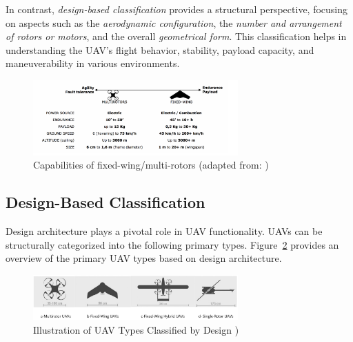 \vspace{0.5cm}

In contrast, \textit{design-based classification} provides a structural perspective, focusing on aspects such as the \textit{aerodynamic configuration}, the \textit{number and arrangement of rotors or motors}, and the overall \textit{geometrical form}. This classification helps in understanding the UAV's flight behavior, stability, payload capacity, and maneuverability in various environments.


\begin{figure}[H]  %
    \centering
    \includegraphics[width=0.7\textwidth]{Figures/Chapter1/Section1/1.png} %
    \caption{ Capabilities of fixed-wing/multi-rotors (adapted from: \cite{khan2024smarttraffic})}
    \label{fig:method3_architecture} %
\end{figure}




\subsection{Design-Based Classification}

Design architecture plays a pivotal role in UAV functionality. UAVs can be structurally categorized into the following primary types. Figure~\ref{fig:uav_design_types} provides an overview of the primary UAV types based on design architecture.

\begin{figure}[H]  %
    \centering
    \includegraphics[width=0.7\textwidth]{Figures/Chapter1/Section1/11.png} %
    \caption{ Illustration of UAV Types Classified by Design )}
    \label{fig:uav_design_types}
\end{figure}



